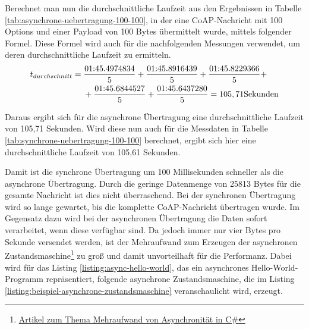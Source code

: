 Berechnet man nun die durchschnittliche Laufzeit aus den Ergebnissen in Tabelle \ref{tab:asynchrone-uebertragung-100-100}, in der eine CoAP-Nachricht mit 100 Options und einer Payload von 100 Bytes übermittelt wurde, mittels folgender Formel. Diese Formel wird auch für die nachfolgenden Messungen verwendet, um deren durchschnittliche Laufzeit zu ermitteln.
\begin{equation}
    \begin{aligned}
        t_{durchschnitt} ={} & \frac{\textnormal{01:45.4974834}}{5} + \frac{\textnormal{01:45.8916439}}{5} + \frac{\textnormal{01:45.8229366}}{5} + \\
        & + \frac{\textnormal{01:45.6844527}}{5} + \frac{\textnormal{01:45.6437280}}{5} = 105,71 \textnormal{Sekunden}
    \end{aligned}
\end{equation}

Daraus ergibt sich für die asynchrone Übertragung eine durchschnittliche Laufzeit von 105,71 Sekunden. Wird diese nun auch für die Messdaten in Tabelle \ref{tab:synchrone-uebertragung-100-100} berechnet, ergibt sich hier eine durchschnittliche Laufzeit von 105,61 Sekunden.

Damit ist die synchrone Übertragung um 100 Millisekunden schneller als die asynchrone Übertragung. Durch die geringe Datenmenge von 25813 Bytes für die gesamte Nachricht ist dies nicht überraschend. Bei der synchronen Übertragung wird so lange gewartet, bis die komplette CoAP-Nachricht übertragen wurde. Im Gegensatz dazu wird bei der asynchronen Übertragung die Daten sofort verarbeitet, wenn diese verfügbar sind. Da jedoch immer nur vier Bytes pro Sekunde versendet werden, ist der Mehraufwand zum Erzeugen der asynchronen Zustandsmaschine\footnote{\href{https://docs.microsoft.com/en-us/archive/msdn-magazine/2011/october/asynchronous-programming-async-performance-understanding-the-costs-of-async-and-await}{Artikel zum Thema Mehraufwand von Asynchronität in C\#}} zu groß und damit unvorteilhaft für die Performanz. Dabei wird für das Listing \ref{listing:async-hello-world}, das ein asynchrones Hello-World-Programm repräsentiert, folgende asynchrone Zustandsmaschine, die im Listing \ref{listing:beispiel-asynchrone-zustandsmaschine} veranschaulicht wird, erzeugt.

